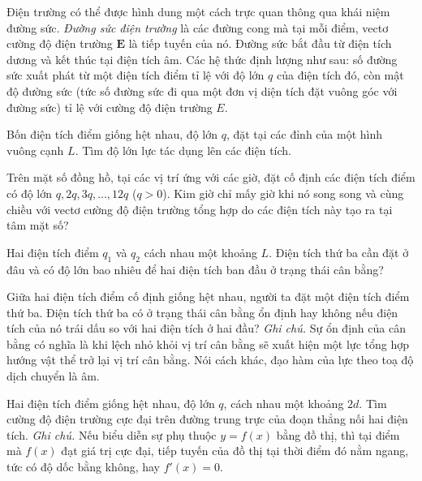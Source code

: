 Điện trường có thể được hình dung một cách trực quan thông qua khái niệm đường sức. \emph{Đường sức điện trường} là các đường cong mà tại mỗi điểm, vectơ cường độ điện trường $\mathbf{E}$ là tiếp tuyến của nó. Đường sức bắt đầu từ điện tích dương và kết thúc tại điện tích âm. Các hệ thức định lượng như sau: số đường sức xuất phát từ một điện tích điểm tỉ lệ với độ lớn $q$ của điện tích đó, còn mật độ đường sức (tức số đường sức đi qua một đơn vị diện tích đặt vuông góc với đường sức) tỉ lệ với cường độ điện trường $E$.

 Bốn điện tích điểm giống hệt nhau, độ lớn $q$, đặt tại các đỉnh của một hình vuông cạnh $L$. Tìm độ lớn lực tác dụng lên các điện tích.


 Trên mặt số đồng hồ, tại các vị trí ứng với các giờ, đặt cố định các điện tích điểm có độ lớn $q, 2q, 3q, \dots, 12q$ ($q>0$). Kim giờ chỉ mấy giờ khi nó song song và cùng chiều với vectơ cường độ điện trường tổng hợp do các điện tích này tạo ra tại tâm mặt số? 


 Hai điện tích điểm $q_1$ và $q_2$ cách nhau một khoảng $L$. Điện tích thứ ba cần đặt ở đâu và có độ lớn bao nhiêu để hai điện tích ban đầu ở trạng thái cân bằng? 

 Giữa hai điện tích điểm cố định giống hệt nhau, người ta đặt một điện tích điểm thứ ba. Điện tích thứ ba có ở trạng thái cân bằng ổn định hay không nếu điện tích của nó trái dấu so với hai điện tích ở hai đầu? \emph{Ghi chú.} Sự ổn định của cân bằng có nghĩa là khi lệch nhỏ khỏi vị trí cân bằng sẽ xuất hiện một lực tổng hợp hướng vật thể trở lại vị trí cân bằng. Nói cách khác, đạo hàm của lực theo toạ độ dịch chuyển là âm.

 Hai điện tích điểm giống hệt nhau, độ lớn $q$, cách nhau một khoảng $2d$. Tìm cường độ điện trường cực đại trên đường trung trực của đoạn thẳng nối hai điện tích. \emph{Ghi chú.} Nếu biểu diễn sự phụ thuộc $y=f(x)$ bằng đồ thị, thì tại điểm mà $f(x)$ đạt giá trị cực đại, tiếp tuyến của đồ thị tại thời điểm đó nằm ngang, tức có độ dốc bằng không, hay $f'(x)=0$.

